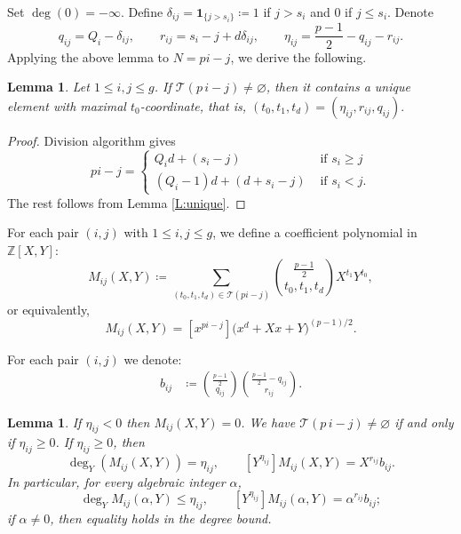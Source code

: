 \documentclass{amsart}
\theoremstyle{plain}
\newtheorem{lemma}[theorem]{Lemma}
\theoremstyle{remark}
\theoremstyle{remark}
\newcommand{\cT}{\mathcal{T}}
\newcommand{\0}{\mathbf{0}}
\newcommand{\1}{\mathbf{1}}
\newcommand{\Z}{\mathbb{Z}}
\begin{document}
Set $\deg(0)=-\infty$.
Define 
$\delta_{ij}=\1_{\{j>s_i\}}\coloneqq 1$ if $j>s_i$ and $0$ if $j\le s_i$.
Denote 
\begin{equation}\label{E:eta}
q_{ij}=Q_i-\delta_{ij},
\qquad
r_{ij}=s_i-j+d\delta_{ij},\qquad
\eta_{ij}=\frac{p-1}{2}-q_{ij}-r_{ij}.
\end{equation}
Applying the above lemma to $N=pi-j$, we derive the following.

\begin{lemma}\label{L:pi-j}
Let $1\le i,j\le g$. 
If $\cT(p\,i-j)\ne \varnothing$,
then it contains a unique element with maximal $t_0$-coordinate, 
that is, 
$
(t_0,t_1,t_d)=
\left(\eta_{ij},r_{ij},
q_{ij}\right).
 $
\end{lemma}
\begin{proof}
Division algorithm gives 
$$
pi-j =
\begin{cases}
Q_id+(s_i-j) & \mbox{ if $s_i\ge j$}\\
(Q_i-1)d+(d+s_i-j) & \mbox{ if $s_i<j$}.
\end{cases}
$$
The rest follows from Lemma \ref{L:unique}.
\end{proof}

For each pair $(i,j)$ with $1\le i,j \le g$, 
we define a coefficient polynomial in $\Z[X,Y]$:
\begin{equation}\label{E:Mij}
 \boxed{   M_{ij}(X,Y) \coloneqq 
    \sum_{(t_0,t_1,t_d)\in \cT(pi-j)}
    \binom{\frac{p-1}{2}}{t_0,t_1,t_d}X^{t_1}Y^{t_0},}
\end{equation}
or equivalently,
\begin{equation*}
M_{ij}(X,Y) =
[x^{pi-j}]\bigl(x^d+Xx+Y\bigr)^{(p-1)/2}.
\end{equation*}

For each pair $(i,j)$
we denote:
\begin{align}
b_{ij}&\coloneqq
\displaystyle\binom{\frac{p-1}{2}}{q_{ij}} 
\binom{\frac{p-1}{2}-q_{ij}}{r_{ij}}.
\label{E:b}
\end{align}

\begin{lemma}\label{L:entry}
If $\eta_{ij}<0$ then $M_{ij}(X,Y)=0$. 
We have $\cT(p\,i-j)\ne \varnothing$ if and only if $\eta_{ij}\ge 0$. 
If $\eta_{ij}\ge 0$, then 
$$
\deg_Y(M_{ij}(X,Y))=  \eta_{ij},\qquad
[Y^{\eta_{ij}}]M_{ij}(X,Y)=X^{r_{ij}}b_{ij}.
$$
In particular, for every algebraic integer $\alpha$, 
$$\deg_Y M_{ij}(\alpha,Y)\le \eta_{ij},
\qquad
[Y^{\eta_{ij}}]M_{ij}(\alpha,Y)=\alpha^{r_{ij}}b_{ij};
$$
if $\alpha\ne 0$, then equality holds in the degree bound.
\end{lemma}
\end{document}
